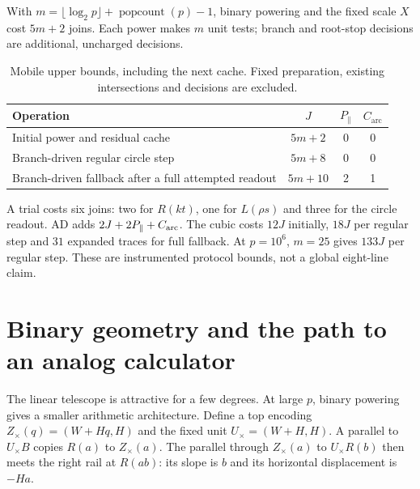 \documentclass[11pt,a4paper]{article}
\begin{document}
With $m=\lfloor\log_2p\rfloor+\operatorname{popcount}(p)-1$, binary powering and the fixed scale $X$ cost $5m+2$ joins. Each power makes $m$ unit tests; branch and root-stop decisions are additional, uncharged decisions.

\begin{table}[H]\centering\small
\caption{Mobile upper bounds, including the next cache. Fixed preparation, existing intersections and decisions are excluded.}
\begin{tabularx}{\linewidth}{@{}Xccc@{}}\toprule
Operation & $J$ & $P_{\parallel}$ & $C_{\mathrm{arc}}$\\\midrule
Initial power and residual cache & $5m+2$ & 0 & 0\\
Branch-driven regular circle step & $5m+8$ & 0 & 0\\
Branch-driven fallback after a full attempted readout & $5m+10$ & 2 & 1\\
\bottomrule
\end{tabularx}
\end{table}
A trial costs six joins: two for $R(kt)$, one for $L(\rho s)$ and three for the circle readout. AD adds $2J+2P_{\parallel}+C_{\rm arc}$. The cubic costs $12J$ initially, $18J$ per regular step and $31$ expanded traces for full fallback. At $p=10^6$, $m=25$ gives $133J$ per regular step. These are instrumented protocol bounds, not a global eight-line claim.

\clearpage
\section{Binary geometry and the path to an analog calculator}\label{sec:binary}
The linear telescope is attractive for a few degrees. At large $p$, binary powering gives a smaller arithmetic architecture. Define a top encoding $Z_\times(q)=(W+Hq,H)$ and the fixed unit $U_\times=(W+H,H)$. A parallel to $U_\times B$ copies $R(a)$ to $Z_\times(a)$. The parallel through $Z_\times(a)$ to $U_\times R(b)$ then meets the right rail at $R(ab)$: its slope is $b$ and its horizontal displacement is $-Ha$.
\end{document}
